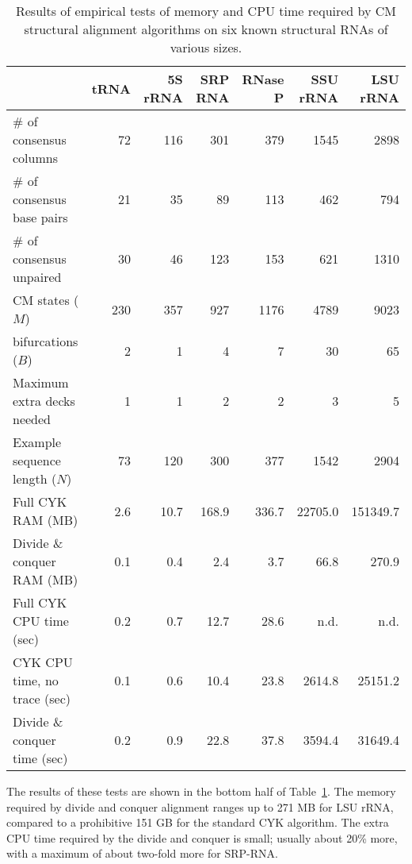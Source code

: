 \documentclass[11pt]{article}
\begin{document}
\begin{table}[ht]
\begin{tabular}{lrrrrrr}
                             & tRNA&5S rRNA&SRP RNA&RNase P&SSU rRNA& LSU rRNA \\\hline 
\# of consensus columns      &  72 &  116 &   301 &   379 &   1545 &    2898\\ 
\# of consensus base pairs   &  21 &   35 &    89 &   113 &    462 &     794\\ 
\# of consensus unpaired     &  30 &   46 &   123 &   153 &    621 &    1310\\ 
CM states ($M$)              & 230 &  357 &   927 &  1176 &   4789 &    9023\\ 
bifurcations ($B$)           &   2 &    1 &     4 &     7 &     30 &      65\\ 
Maximum extra decks needed   &   1 &    1 &     2 &     2 &      3 &       5\\ 
Example sequence length ($N$)&  73 &  120 &   300 &   377 &   1542 &    2904\\
Full CYK RAM (MB)            & 2.6 & 10.7 & 168.9 & 336.7 &22705.0 &151349.7\\
Divide \& conquer RAM (MB)   & 0.1 &  0.4 &   2.4 &   3.7 &   66.8 &   270.9\\ 
Full CYK CPU time (sec)      & 0.2 &  0.7 &  12.7 &  28.6 &   n.d. &    n.d.\\ 
CYK CPU time, no trace (sec) & 0.1 &  0.6 &  10.4 &  23.8 & 2614.8 & 25151.2\\
Divide \& conquer time (sec) & 0.2 &  0.9 &  22.8 &  37.8 & 3594.4 & 31649.4\\\hline
\end{tabular}
\caption{Results of empirical tests of memory and CPU time required by
CM structural alignment algorithms on six known structural RNAs of
various sizes.}
\label{tbl:results}
\end{table}

The results of these tests are shown in the bottom half of
Table~\ref{tbl:results}. The memory required by divide and conquer
alignment ranges up to 271 MB for LSU rRNA, compared to a prohibitive
151 GB for the standard CYK algorithm. The extra CPU time required by
the divide and conquer is small; usually about 20\% more, with a
maximum of about two-fold more for SRP-RNA.
\end{document}
